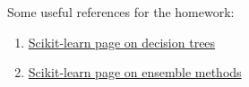 \documentclass[colorlinks]{article}
\begin{document}
Some useful references for the homework:

\begin{enumerate}
	\item \href{https://scikit-learn.org/stable/modules/tree.html}{Scikit-learn page on decision trees}
		\item \href{https://scikit-learn.org/stable/modules/ensemble.html}{Scikit-learn page on ensemble methods}
\end{enumerate}
\end{document}
